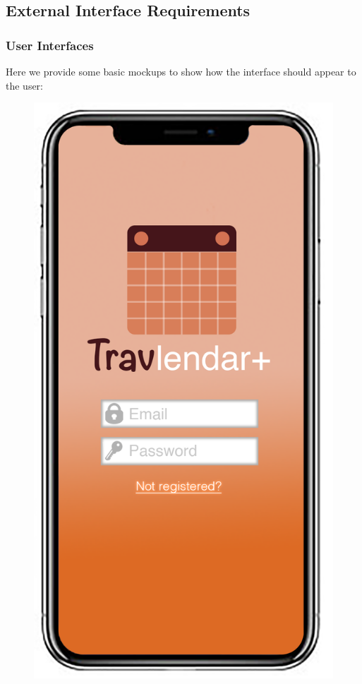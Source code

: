 \subsection{External Interface Requirements}
	\subsubsection{User Interfaces}
		Here we provide some basic mockups to show how the interface should appear to the user:\newline
		
		\begin{figure}[H]
			\begin{minipage}{0.33\textwidth}
				\centerline{\includegraphics[scale=0.4]{Images/Home}}

\end{minipage}
\end{figure}
